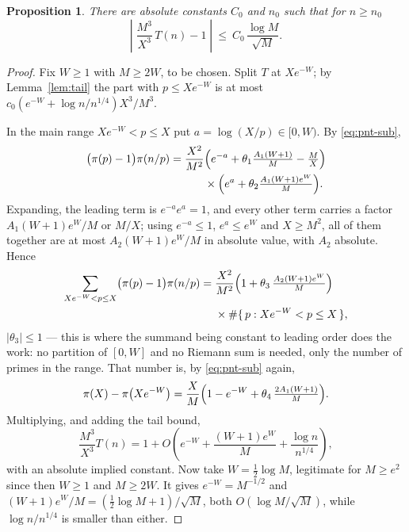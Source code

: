 \documentclass[a4paper,11pt,oneside,reqno]{amsart}
\theoremstyle{definition}
\theoremstyle{remark}
\theoremstyle{plain}
\newtheorem{proposition}[definition]{Proposition}
\begin{document}
\begin{proposition}\label{prop:T}
  There are absolute constants \(C_0\) and \(n_0\) such that for \(n \ge n_0\)
  \[
    \left|\;\frac{M^{3}}{X^{3}}\,T(n)-1\;\right|
      \ \le \ C_0\,\frac{\log M}{\sqrt M} .
  \]
\end{proposition}

\begin{proof}
  Fix \(W \ge 1\) with \(M \ge 2W\), to be chosen. Split \(T\) at \(Xe^{-W}\); by
  Lemma~\ref{lem:tail} the part with \(p \le Xe^{-W}\) is at most
  \(c_0(e^{-W}+\log n/n^{1/4})X^{3}/M^{3}\).

  In the main range \(Xe^{-W} < p \le X\) put \(a = \log(X/p) \in [0,W)\). By
  \eqref{eq:pnt-sub},
  \begin{align*}
    \bigl(\pi(p)-1\bigr)\pi(n/p)
      =\frac{X^{2}}{M^{2}}
       &\Bigl(e^{-a}+\theta_1\tfrac{A_1(W+1)}{M}-\tfrac{M}{X}\Bigr)\\
       &\times
       \Bigl(e^{a}+\theta_2\tfrac{A_1(W+1)e^{W}}{M}\Bigr).
  \end{align*}
  Expanding, the leading term is \(e^{-a}e^{a} = 1\), and every other term
  carries a factor \(A_1(W+1)e^{W}/M\) or \(M/X\); using \(e^{-a} \le 1\),
  \(e^{a} \le e^{W}\) and \(X \ge M^{2}\), all of them together are at most
  \(A_2(W+1)e^{W}/M\) in absolute value, with \(A_2\) absolute. Hence
  \begin{align*}
    \sum_{Xe^{-W} < p \le X}\bigl(\pi(p)-1\bigr)\pi(n/p)
      ={}&\frac{X^{2}}{M^{2}}
          \Bigl(1+\theta_3\,\tfrac{A_2(W+1)e^{W}}{M}\Bigr)\\
        &\times \#\{\,p : Xe^{-W} < p \le X\,\},
  \end{align*}
  \(|\theta_3|\le 1\) --- this is where the summand being constant to leading
  order does the work: no partition of \([0,W]\) and no Riemann sum is needed,
  only the number of primes in the range. That number is, by
  \eqref{eq:pnt-sub} again,
  \[
    \pi(X)-\pi\bigl(Xe^{-W}\bigr)
      =\frac{X}{M}\Bigl(1-e^{-W}+\theta_4\,\tfrac{2A_1(W+1)}{M}\Bigr).
  \]
  Multiplying, and adding the tail bound,
  \[
    \frac{M^{3}}{X^{3}}T(n)
      =1+O\!\left(e^{-W}+\frac{(W+1)e^{W}}{M}+\frac{\log n}{n^{1/4}}\right),
  \]
  with an absolute implied constant. Now take \(W = \tfrac{1}{2}\log M\), legitimate
  for \(M \ge e^{2}\) since then \(W \ge 1\) and \(M \ge 2W\). It gives
  \(e^{-W} = M^{-1/2}\) and \((W+1)e^{W}/M = (\tfrac{1}{2}\log M+1)/\sqrt M\), both
  \(O(\log M/\sqrt M)\), while \(\log n/n^{1/4}\) is smaller than either.
\end{proof}
\end{document}
